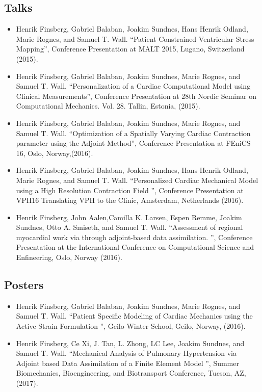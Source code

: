 \subsection{Talks}
\begin{itemize}
  \item Henrik Finsberg, Gabriel Balaban, Joakim Sundnes, Hans
    Henrik Odland, Marie Rognes, and Samuel T. Wall. ``Patient
    Constrained Ventricular Stress Mapping'',
    Conference Presentation at MALT 2015,  Lugano, Switzerland (2015).
  \item Henrik Finsberg, Gabriel Balaban, Joakim Sundnes, Marie
    Rognes, and Samuel T. Wall. ``Personalization of a Cardiac
    Computational Model using Clinical Measurements'', Conference
    Presentation at 28th Nordic Seminar on Computational
    Mechanics. Vol. 28. Tallin, Estonia, (2015).
  \item Henrik Finsberg, Gabriel Balaban, Joakim Sundnes, Marie
    Rognes, and Samuel T. Wall. ``Optimization of a Spatially Varying
    Cardiac Contraction parameter using the Adjoint Method'',
    Conference Presentation at FEniCS 16, Oslo, Norway,(2016).
  \item Henrik Finsberg, Gabriel Balaban, Joakim Sundnes, Hans
    Henrik Odland, Marie Rognes, and Samuel T. Wall. ``Personalized
    Cardiac Mechanical Model using a High Resolution Contraction Field
    '',  Conference Presentation at VPH16 Translating VPH to the
    Clinic,  Amsterdam, Netherlands (2016).
  \item Henrik Finsberg, John Aalen,Camilla K.
    Larsen, Espen Remme, Joakim Sundnes, Otto A. Smiseth, and 
    Samuel T. Wall. ``Assessment of regional myocardial work via through
    adjoint-based data assimilation. '',  Conference Presentation at
    the International Conference on Computational Science and
    Enfineering, Oslo, Norway (2016).
\end{itemize}


\subsection{Posters}
\begin{itemize}
  \item Henrik Finsberg, Gabriel Balaban, Joakim Sundnes, Marie
    Rognes, and Samuel T. Wall. ``Patient Specific Modeling of Cardiac
    Mechanics using the Active Strain Formulation '',
    Geilo Winter School, Geilo, Norway, (2016).
  \item Henrik Finsberg, Ce Xi, J. Tan, L. Zhong, LC Lee, Joakim
    Sundnes, and Samuel T. Wall. ``Mechanical Analysis of Pulmonary
    Hypertension via Adjoint based Data Assimilation of a Finite
    Element Model '', Summer Biomechanics, Bioengineering, and
    Biotransport Conference, Tucson, AZ, (2017). 
  \end{itemize}


